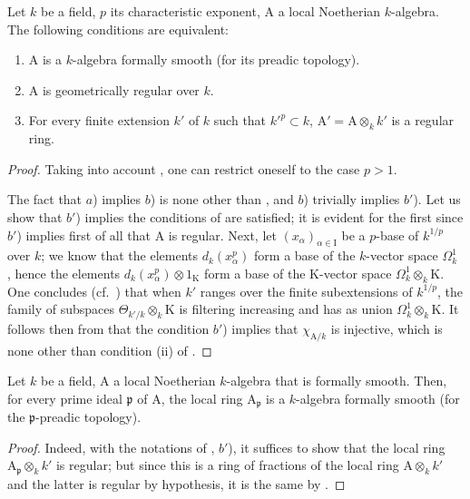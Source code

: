 \begin{theorem}[22.5.8]
\label{0.22.5.8}
Let $k$ be a field, $p$ its characteristic exponent, $\mathrm{A}$ a local Noetherian $k$-algebra.
The following conditions are equivalent:
\begin{enumerate}
  \item[a)] $\mathrm{A}$ is a $k$-algebra formally smooth (for its preadic topology).
  \item[b)] $\mathrm{A}$ is geometrically regular over $k$.
  \item[b')] For every finite extension $k'$ of $k$ such that $k'^p\subset k$, $\mathrm{A}'=\mathrm{A}\otimes_kk'$ is a regular ring.
\end{enumerate}
\end{theorem}

\begin{proof}
Taking into account , one can restrict oneself to the case $p>1$.

The fact that $a$) implies $b$) is none other than , and $b$) trivially implies $b'$).
Let us show that $b'$) implies the conditions of  are satisfied; it is evident for the first  since $b'$) implies first of all that $\mathrm{A}$ is regular.
Next, let $(x_\alpha)_{\alpha\in\mathrm{I}}$ be a $p$-base of $k^{1/p}$ over $k$; we know that the elements $d_k(x_\alpha^p)$ form a base of the $k$-vector space $\Omega^1_k$ , hence the elements $d_k(x_\alpha^p)\otimes 1_\mathrm{K}$ form a base of the $\mathrm{K}$-vector space $\Omega^1_k\otimes_k\mathrm{K}$.
One concludes (cf.~) that when $k'$ ranges over the finite subextensions of $k^{1/p}$, the family of subspaces $\Theta_{k'/k}\otimes_k\mathrm{K}$ is filtering increasing and has as union $\Omega^1_k\otimes_k\mathrm{K}$.
It follows then from  that the condition $b'$) implies that $\chi_{\mathrm{A}/k}$ is injective, which is none other than condition (ii) of .
\end{proof}

\begin{corollary}[22.5.9]
\label{0.22.5.9}
Let $k$ be a field, $\mathrm{A}$ a local Noetherian $k$-algebra that is formally smooth.
Then, for every prime ideal $\mathfrak{p}$ of $\mathrm{A}$, the local ring $\mathrm{A}_\mathfrak{p}$ is a $k$-algebra formally smooth (for the $\mathfrak{p}$-preadic topology).
\end{corollary}

\begin{proof}
Indeed, with the notations of , $b'$), it suffices to show that the local ring $\mathrm{A}_\mathfrak{p}\otimes_kk'$ is regular; but since this is a ring of fractions of the local ring $\mathrm{A}\otimes_kk'$ and the latter is regular by hypothesis, it is the same by .
\end{proof}

